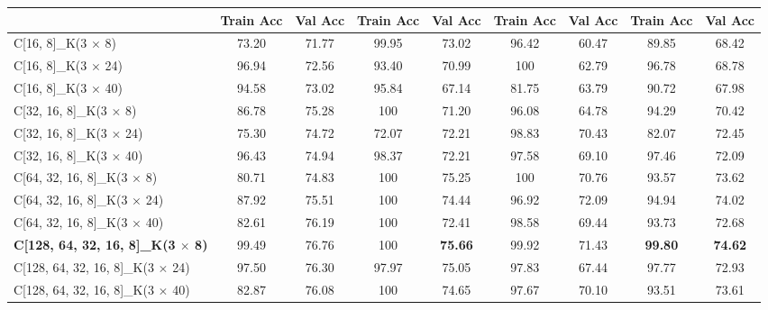 \documentclass{ieeeaccess}
\begin{document}
{\begin{table*}[htb]
\begin{tabular}{|l|cc|cc|cc|cc|}
        &  \textbf{Train Acc} &  \textbf{Val Acc} &  \textbf{Train Acc} &  \textbf{Val Acc} &      \textbf{Train Acc} &     \textbf{Val Acc} &    \textbf{Train Acc} &   \textbf{Val Acc} \\
        \midrule
        C[16, 8]\_K(3 $\times$ 8)                    &      73.20 &       71.77 &        99.95 &         73.02 &      96.42 &      60.47 &      89.85 &      68.42 \\
        C[16, 8]\_K(3 $\times$ 24)                   &      96.94 &       72.56 &        93.40 &         70.99 &     100 &         62.79 &      96.78 &      68.78 \\
        C[16, 8]\_K(3 $\times$ 40)                   &      94.58 &       73.02 &        95.84 &         67.14 &      81.75 &      63.79 &      90.72 &      67.98 \\
        C[32, 16, 8]\_K(3 $\times$ 8)                &      86.78 &       75.28 &       100 &            71.20 &      96.08 &      64.78 &      94.29 &      70.42 \\
        C[32, 16, 8]\_K(3 $\times$ 24)               &      75.30 &       74.72 &        72.07 &         72.21 &      98.83 &      70.43 &      82.07 &      72.45 \\
        C[32, 16, 8]\_K(3 $\times$ 40)               &      96.43 &       74.94 &        98.37 &         72.21 &      97.58 &      69.10 &      97.46 &      72.09 \\
        C[64, 32, 16, 8]\_K(3 $\times$ 8)            &      80.71 &       74.83 &       100 &            75.25 &     100 &         70.76 &      93.57 &      73.62 \\
        C[64, 32, 16, 8]\_K(3 $\times$ 24)           &      87.92 &       75.51 &       100 &            74.44 &      96.92 &      72.09 &      94.94 &      74.02 \\
        C[64, 32, 16, 8]\_K(3 $\times$ 40)           &      82.61 &       76.19 &       100 &            72.41 &      98.58 &      69.44 &      93.73 &      72.68 \\
        \textbf{C[128, 64, 32, 16, 8]\_K(3 $\times$ 8)}  &  99.49 &       76.76 &       100 &    \textbf{75.66} &     99.92 &      71.43 &      \textbf{99.80} &      \textbf{74.62} \\
        C[128, 64, 32, 16, 8]\_K(3 $\times$ 24)      &      97.50 &       76.30 &        97.97 &         75.05 &      97.83 &      67.44 &      97.77 &      72.93 \\
        C[128, 64, 32, 16, 8]\_K(3 $\times$ 40)      &      82.87 &       76.08 &       100 &            74.65 &      97.67 &      70.10 &      93.51 &      73.61 \\

\end{tabular}
\end{table*}}
\end{document}
